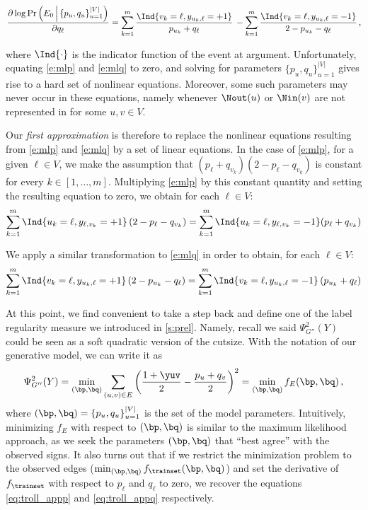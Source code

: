\begin{equation}\label{e:mlq}
\frac{\partial \log \Pr\left(E_0 \,\Big|\, \{p_u, q_u\}_{u=1}^{|V|}\right)}{\partial q_{\ell}}
= \sum_{k=1}^m
\frac{\Ind{v_k = \ell,y_{u_k,\ell}=+1}}{p_{u_k}+q_{\ell}}\,
- \sum_{k=1}^m
\frac{\Ind{v_k = \ell,y_{u_k,\ell}=-1}}{2-p_{u_k}-q_{\ell}}\,,
\end{equation}

where $\Ind{\cdot}$ is the indicator function of the event at argument.
Unfortunately, equating \eqref{e:mlp} and \eqref{e:mlq} to zero, and solving for parameters
$\{p_u, q_u\}_{u=1}^{|V|}$ gives rise to a hard set of nonlinear equations.
Moreover, some such parameters may never occur in these equations, namely whenever $\Nout(u)$ or
$\Nin(v)$ are not represented in \trainset{} for some $u,v\in V$.

Our \emph{first approximation} is therefore to replace the nonlinear equations resulting
from \eqref{e:mlp} and \eqref{e:mlq} by a set of linear equations. In the case of \eqref{e:mlp}, for
a given $\ell \in V$, we make the assumption that $(p_{\ell}+q_{v_k}) (2-p_{\ell}-q_{v_k})$ is
constant for every $k \in [1,\ldots,m]$. Multiplying \eqref{e:mlp} by this constant
quantity and setting the resulting equation to zero, we obtain for each $\ell \in V$:
\begin{equation}
  \label{eq:troll_appp}
  \sum_{k=1}^m \Ind{u_k = \ell,y_{\ell,v_k}=+1} \left(2-p_{\ell}-q_{v_k}\right)
  = \sum_{k=1}^m \Ind{u_k = \ell,y_{\ell,v_k}=-1}
  (p_{\ell}+q_{v_k})
\end{equation}

We apply a similar transformation to \eqref{e:mlq} in order to obtain, for each $\ell \in V$:
\begin{equation}
  \label{eq:troll_appq}
  \sum_{k=1}^m \Ind{v_k = \ell,y_{u_k,\ell}=+1} \left(2-p_{u_k}-q_{\ell}\right)
  = \sum_{k=1}^m  \Ind{v_k = \ell,y_{u_k,\ell}=-1}
  \left(p_{u_k}+q_{\ell}\right)
\end{equation}

At this point, we find convenient to take a step back and define one of the label
regularity measure we introduced in \autoref{s:prel}. Namely, recall we said $\Psi^2_{G''}(Y)$ could
be seen as a soft quadratic version of the cutsize. With the notation of our generative model, we
can write it as
\begin{equation*}
  \Psi^2_{G''}(Y) = \min_{(\bp,\bq)} \sum_{(u,v) \in E}
  \left(\frac{1+\yuv}{2} - \frac{p_u+q_v}{2} \right)^2 =  
  \min_{(\bp,\bq)} f_E(\bp, \bq)\, ,
\end{equation*}
where $(\bp,\bq) =\{p_u, q_u\}_{u=1}^{|V|}$ is the set of the model parameters. Intuitively,
minimizing $f_E$ with respect to $(\bp,\bq)$ is similar to the maximum likelihood approach, as we
seek the parameters $(\bp, \bq)$ that \enquote{best agree} with the observed signs. It also turns
out that if we restrict the minimization problem to the observed edges (\ie $\min_{(\bp,\bq)}
f_{\trainset}(\bp,\bq)$) and set the derivative of $f_{\trainset}$ with respect to $p_\ell$ and
$q_\ell$ to zero, we recover the equations \eqref{eq:troll_appp} and \eqref{eq:troll_appq}
respectively.

